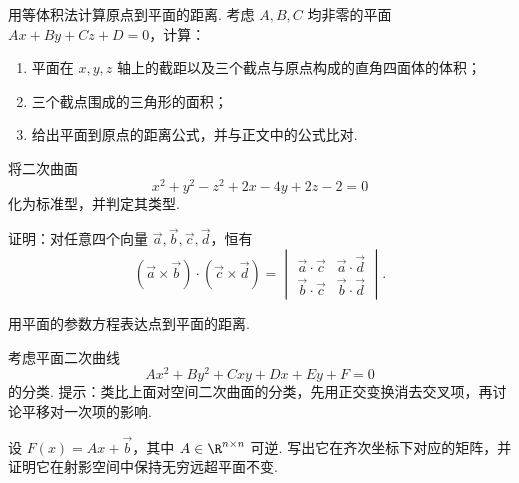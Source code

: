 \begin{exercise}

    \begin{exgroup}
        \item 用等体积法计算原点到平面的距离. 考虑 $A, B, C$ 均非零的平面 $A x + B y + C z + D = 0$，计算：
        \begin{enumerate}
            \item 平面在 $x, y, z$ 轴上的截距以及三个截点与原点构成的直角四面体的体积；
            \item 三个截点围成的三角形的面积；
            \item 给出平面到原点的距离公式，并与正文中的公式比对.
        \end{enumerate}

        \item 将二次曲面
        \[
            x^2 + y^2 - z^2 + 2x - 4y + 2z - 2 = 0
        \]
        化为标准型，并判定其类型.
    \end{exgroup}

    \begin{exgroup}
        \item 证明：对任意四个向量 $\vec{a}, \vec{b}, \vec{c}, \vec{d}$，恒有
        \[
            (\vec{a} \times \vec{b}) \cdot (\vec{c} \times \vec{d}) = \begin{vmatrix}
                \vec{a} \cdot \vec{c} & \vec{a} \cdot \vec{d} \\
                \vec{b} \cdot \vec{c} & \vec{b} \cdot \vec{d}
            \end{vmatrix}.
        \]

        \item 用平面的参数方程表达点到平面的距离.
    \end{exgroup}

    \begin{exgroup}
        \item 考虑平面二次曲线
        \[
            A x^2 + B y^2 + C x y + D x + E y + F = 0
        \]
        的分类. 提示：类比上面对空间二次曲面的分类，先用正交变换消去交叉项，再讨论平移对一次项的影响.

        \item 设 $F(x) = A x + \vec{b}$，其中 $A \in \R^{n\times n}$ 可逆. 写出它在齐次坐标下对应的矩阵，并证明它在射影空间中保持无穷远超平面不变.
    \end{exgroup}
\end{exercise}
